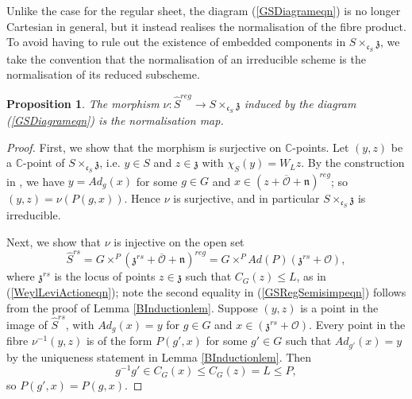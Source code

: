 \documentclass{amsart}
\newtheorem{proposition}[theorem]{Proposition}
\theoremstyle{remark}
\numberwithin{theorem}{section}
\numberwithin{equation}{section}
\begin{document}
Unlike the case for the regular sheet, the diagram (\ref{GSDiagrameqn}) is no longer Cartesian in general, but it instead realises the normalisation of the fibre product. To avoid having to rule out the existence of embedded components in $S \times_{\mathfrak{c}_S} \mathfrak{z}$, we take the convention that the normalisation of an irreducible scheme is the normalisation of its reduced subscheme.

\begin{proposition}\label{GSCartesianprp}
    The morphism $\nu:\hat{S}^{reg} \rightarrow S \times_{\mathfrak{c}_S} \mathfrak{z}$ induced by the diagram (\ref{GSDiagrameqn}) is the normalisation map.
\end{proposition}

\begin{proof}
First, we show that the morphism is surjective on $\mathbb{C}$-points. Let $(y,z)$ be a $\mathbb{C}$-point of $S \times_{\mathfrak{c}_S} \mathfrak{z}$, i.e. $y \in S$ and $z \in \mathfrak{z}$ with $\chi_S(y) = W_Lz$. By the construction in \cite[5.1]{Borho2}, we have $y = Ad_g(x)$ for some $g \in G$ and $x \in (z+\overline{\mathcal O}+\mathfrak{n})^{reg}$; so $(y,z) = \nu(P(g,x))$. Hence $\nu$ is surjective, and in particular $S \times_{\mathfrak{c}_S} \mathfrak{z}$ is irreducible.

Next, we show that $\nu$ is injective on the open set 
\begin{equation}\label{GSRegSemisimpeqn}
    \hat{S}^{rs}=G\times^P(\mathfrak{z}^{rs}+\overline{\mathcal O} +\mathfrak{n})^{reg} = G \times^PAd(P)(\mathfrak{z}^{rs}+\mathcal O),
\end{equation}
where $\mathfrak{z}^{rs}$ is the locus of points $z \in \mathfrak{z}$ such that $C_G(z) \leq L$, as in (\ref{WeylLeviActioneqn}); note the second equality in (\ref{GSRegSemisimpeqn}) follows from the proof of Lemma \ref{BInductionlem}. Suppose $(y,z)$ is a point in the image of $\hat{S}^{rs}$, with $Ad_g(x) = y$ for $g \in G$ and $x \in (\mathfrak{z}^{rs}+\mathcal O)$. Every point in the fibre $\nu^{-1}(y,z)$ is of the form $P(g',x)$ for some $g' \in G$ such that $Ad_{g'}(x) = y$ by the uniqueness statement in Lemma \ref{BInductionlem}. Then 
\begin{equation}\label{GSCartesian1eqn}
    g^{-1}g' \in C_G(x) \leq C_G(z) = L \leq P,
\end{equation}
so $P(g',x) = P(g,x)$.


\end{proof}
\end{document}
